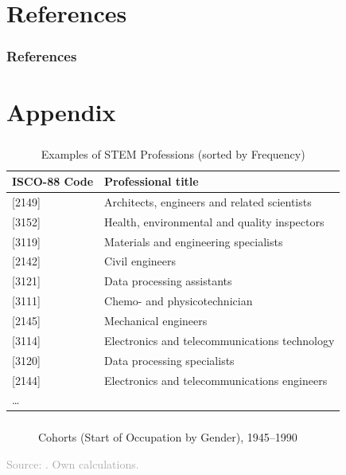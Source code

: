 \documentclass[11pt, aspectratio=1610, xcolor={dvipsnames}]{beamer}
\begin{document}
	\section*{References}
	\begin{frame}[allowframebreaks]
		\frametitle{References}
		
		{\scriptsize
		
		}
		
	\end{frame}
	
	\appendix
	
	\section{Appendix}
		\begin{frame}
		\frametitle{}
		
		{\linespread{1}\small
			\begin{table}[h]
				\centering
				\caption{Examples of STEM Professions (sorted by Frequency)}
				\label{tab:stem_examples}
				
				\begin{tabular}{ll}
					\toprule
					ISCO-88 Code & Professional title\\
					\midrule
					{[2149]} & Architects, engineers and related scientists\\
					{[3152]} & Health, environmental and quality inspectors\\
					{[3119]} & Materials and engineering specialists\\
					{[2142]} & Civil engineers\\
					{[3121]} & Data processing assistants\\
					{[3111]} & Chemo- and physicotechnician\\
					{[2145]} & Mechanical engineers\\
					{[3114]} & Electronics and telecommunications technology\\
					{[3120]} & Data processing specialists\\
					{[2144]} & Electronics and telecommunications engineers\\
					… &\\
					\bottomrule
				\end{tabular}
			\end{table}
		}
		
	\end{frame}
	
	\begin{frame}
		\frametitle{}
		
		\begin{figure}[h]
			\centering
			\caption{Cohorts (Start of Occupation by Gender), 1945--1990}
			\label{fig:validity}
			\resizebox{75mm}{!}{}
		\end{figure}
		
		{\scriptsize
			\textcolor{darkgray}{Source: \cite{Mayer1995}. Own calculations.}
		}
		
	\end{frame}
	
\end{document}

